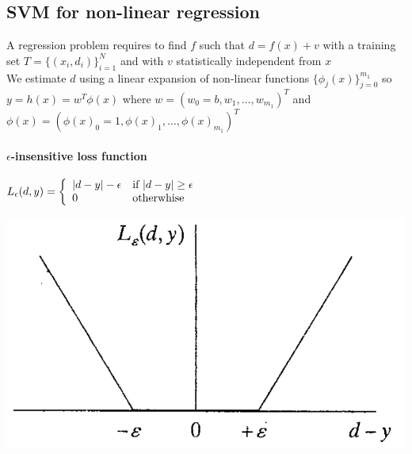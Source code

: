\documentclass[10pt]{report}
\begin{document}
\subsection{SVM for non-linear regression}
A regression problem requires to find $f$ such that $d=f(x)+v$ with a training set $T=\{(x_i,d_i)\}_{i=1}^N$ and with $v$ statistically independent from $x$\\
We estimate $d$ using a linear expansion of non-linear functions $\{\phi_j(x)\}_{j=0}^{m_1}$ so $y=h(x) = w^T\phi(x)$ where $w = (w_0 = b, w_1,\ldots,w_{m_1})^T$ and $\phi(x) = (\phi(x)_0 = 1, \phi(x)_1,\ldots, \phi(x)_{m_1})^T$
\paragraph{$\epsilon$-insensitive loss function} $L_\epsilon(d,y) = \left\{\begin{array}{l l}
|d - y| - \epsilon & \text{if }|d-y|\geq\epsilon\\
0 & \text{otherwhise}
\end{array} \right.$
\begin{center}
	\includegraphics[scale=0.5]{22.png}
\end{center}
\end{document}

